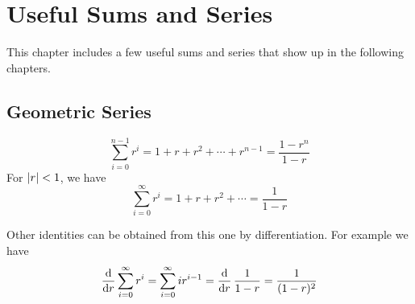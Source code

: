\chapter{Useful Sums and Series}
This chapter includes a few useful sums and series that show up in the following chapters.
\section{Geometric Series}
\[
    \sum_{i = 0}^{n-1} r^i = 1 + r + r^2 + \cdots + r^{n-1} = \frac{1-r^n}{1-r}
\]
For $\left|r\right| < 1$, we have
\[
    \sum_{i = 0}^{\infty} r^i = 1 + r + r^2 + \cdots = \frac{1}{1-r}
\]
\begin{info}
Other identities can be obtained from this one by differentiation. For example we have
\[
    \frac{\operatorname{d}\!{}}{\operatorname{d}\!{r}}\sum_{i = 0}^{\infty} r^i = \sum_{i = 0}^{\infty} ir^{i-1} = \frac{\operatorname{d}\!{}}{\operatorname{d}\!{r}}\,\frac{1}{1-r} = \frac{1}{(1-r)^2}
\]
\end{info}